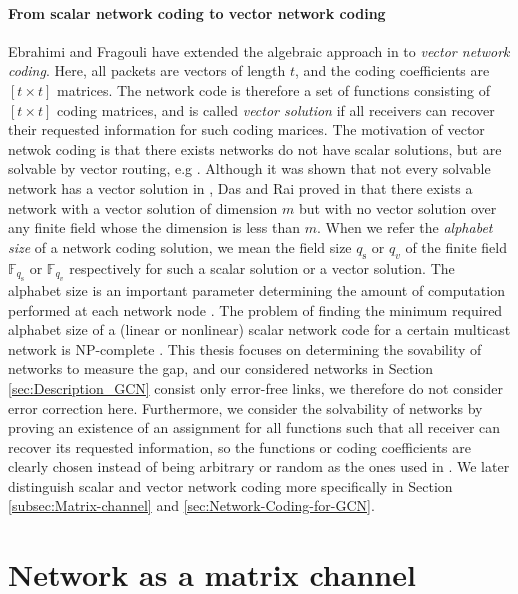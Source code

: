 \paragraph{From scalar network coding to vector network coding}

Ebrahimi and Fragouli \cite{Ebrahimi:2011} have extended the algebraic
approach in \cite{Koetter:2003} to \textit{vector network coding}.
Here, all packets are vectors of length $t$, and the coding coefficients
are $\left[t\times t\right]$ matrices. The network code is therefore
a set of functions consisting of $\left[t\times t\right]$ coding
matrices, and is called \textit{vector solution} if all receivers
can recover their requested information for such coding marices. The
motivation of vector netwok coding is that there exists networks do
not have scalar solutions, but are solvable by vector routing, e.g
\cite{Medard:2003}. Although it was shown that not every solvable
network has a vector solution in \cite[Lemma II.2]{Dougherty:2005},
Das and Rai proved in \cite{Das:2016} that there exists a network
with a vector solution of dimension $m$ but with no vector solution
over any finite field whose the dimension is less than $m$. When
we refer the \textit{alphabet size} of a network coding solution,
we mean the field size $q_{\mathrm{s}}$ or $q_{v}$ of the finite
field $\ensuremath{\mathbb{F}}_{q_{\mathrm{s}}}$ or $\ensuremath{\mathbb{F}}_{q_{v}}$
respectively for such a scalar solution or a vector solution. The
alphabet size is an important parameter determining the amount of
computation performed at each network node \cite{Wachter-Zeh:2018}.
The problem of finding the minimum required alphabet size of a (linear
or nonlinear) scalar network code for a certain multicast network
is NP-complete \cite{Langberg:2009,Lehman:2004,Gone:2018}. This thesis
focuses on determining the sovability of networks to measure the gap,
and our considered networks in Section \ref{sec:Description_GCN}
consist only error-free links, we therefore do not consider error
correction here. Furthermore, we consider the solvability of networks
by proving an existence of an assignment for all functions such that
all receiver can recover its requested information, so the functions
or coding coefficients are clearly chosen instead of being arbitrary
or random as the ones used in \cite{Ho:2003,Ahlswede:2000}. We later
distinguish scalar and vector network coding more specifically in
Section \ref{subsec:Matrix-channel} and \ref{sec:Network-Coding-for-GCN}.

\section{Network as a matrix channel \label{subsec:Matrix-channel}}

